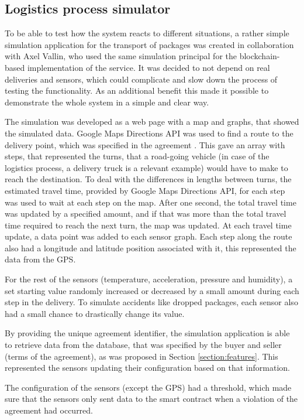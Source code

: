 \subsection{Logistics process simulator} \label{section:simulation}

To be able to test how the system reacts to different situations, a rather simple simulation application for the transport of packages was created in collaboration with Axel Vallin, who used the same simulation principal for the blockchain-based implementation of the service. It was decided to not depend on real deliveries and sensors, which could complicate and slow down the process of testing the functionality. As an additional benefit this made it possible to demonstrate the whole system in a simple and clear way.

The simulation was developed as a web page with a map and graphs, that showed the simulated data. Google Maps Directions API  was used to find a route to the delivery point, which was specified in the agreement \citep{mapsapi}. This gave an array with steps, that represented the turns, that a road-going vehicle (in case of the logistics process, a delivery truck is a relevant example) would have to make to reach the destination. To deal with the differences in lengths between turns, the estimated travel time, provided by Google Maps Directions API, for each step was used to wait at each step on the map. After one second, the total travel time was updated by a specified amount, and if that was more than the total travel time required to reach the next turn, the map was updated. At each travel time update, a data point was added to each sensor graph. Each step along the route also had a longitude and latitude position associated with it, this represented the data from the GPS.

For the rest of the sensors (temperature, acceleration, pressure and humidity), a set starting value randomly increased or decreased by a small amount during each step in the delivery. To simulate accidents like dropped packages, each sensor also had a small chance to drastically change its value.

By providing the unique agreement identifier, the simulation application is able to retrieve data from the database, that was specified by the buyer and seller (terms of the agreement), as was proposed in Section \ref{section:features}. This represented the sensors updating their configuration based on that information.

The configuration of the sensors (except the GPS) had a threshold, which made sure that the sensors only sent data to the smart contract when a violation of the agreement had occurred.
